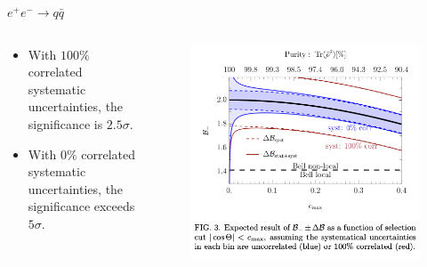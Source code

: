 \documentclass{beamer}
\begin{document}
    \begin{frame}{$e^+e^-\to q\bar{q}$ \footnotesize {}}
        \begin{columns}
            \begin{column}{0.5\textwidth}
                \begin{itemize}
                    \item With $100\%$ correlated systematic uncertainties, the significance is $2.5\sigma$.
                    \item With $0\%$ correlated systematic uncertainties, the significance exceeds $5\sigma$.
                \end{itemize}
            \end{column}
            \begin{column}{0.5\textwidth}
                \begin{figure}[htbp]
                    \centering
                    \includegraphics[width=\linewidth]{img/eeqq3.png}
                \end{figure}
            \end{column}
        \end{columns}    
    \end{frame}
\end{document}
